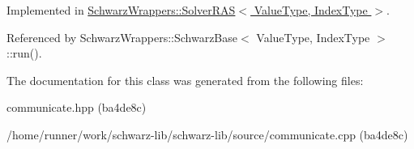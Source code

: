 Implemented in \hyperlink{classSchwarzWrappers_1_1SolverRAS_a1a741b69e1cd7623c6e2d8467aedaa7c}{Schwarz\+Wrappers\+::\+Solver\+R\+A\+S$<$ Value\+Type, Index\+Type $>$}.



Referenced by Schwarz\+Wrappers\+::\+Schwarz\+Base$<$ Value\+Type, Index\+Type $>$\+::run().



The documentation for this class was generated from the following files\+:\begin{DoxyCompactItemize}
\item 
communicate.\+hpp (ba4de8c)\item 
/home/runner/work/schwarz-\/lib/schwarz-\/lib/source/communicate.\+cpp (ba4de8c)\end{DoxyCompactItemize}
